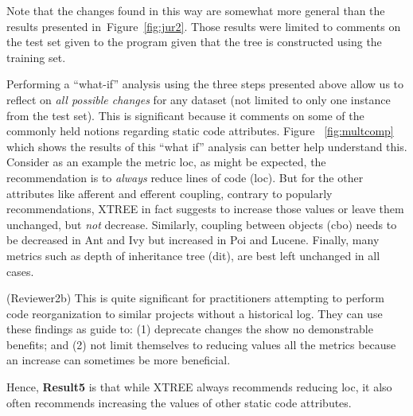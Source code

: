 \documentclass[twocolumn,5p]{elsarticle}
\newcommand{\fig}[1]{Figure~\ref{fig:#1}}
\theoremstyle{break}
\begin{document}
	
	{\color{steel}
	Note that the changes found in this way are somewhat more general than the 
	results presented in~\fig{jur2}. Those results were limited to comments on 
	the test set given to the program given that the tree is constructed using 
	the training set. 
	
	Performing a ``what-if'' analysis using the three steps presented above 
	allow us to reflect on {\em all possible changes} for any dataset (not 
	limited to only one instance from the test set). This is significant 
	because it comments on some of the commonly held notions regarding static 
	code attributes. Figure ~\ref{fig:multcomp} which shows the results of this 
	``what if'' analysis can better help understand this. Consider as an 
	example the metric loc, as might be expected, the recommendation is to
	\textit{always} reduce lines of code (loc). But for the other attributes 
	like afferent and efferent coupling, contrary to popularly recommendations,
	XTREE in fact suggests to increase those values or leave them unchanged, 
	but \textit{not} decrease. Similarly, coupling between objects (cbo) needs 
	to be decreased in Ant and Ivy but increased in Poi and Lucene. Finally, 
	many metrics such as depth of inheritance tree (dit), are best left 
	unchanged in all cases. 
	
	{\color{steel2} (Reviewer2b) This is quite significant for practitioners 
	attempting to perform code reorganization to similar projects without a 
	historical log. They can use these findings as guide to: (1) deprecate 
	changes the show no demonstrable benefits; and (2) not limit themselves to 
	reducing values all the metrics because an increase can sometimes be more 
	beneficial.}
	
	
	Hence, {\bf Result5} is that while XTREE always recommends reducing loc,
	it also   often recommends increasing the values of other static code 
	attributes.}
	
	
\end{document}
